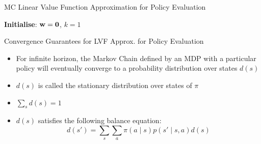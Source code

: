 \documentclass[aspectratio=169]{../latex_main/tntbeamer}  %
\begin{document}
\begin{frame}[c]{MC Linear Value Function Approximation for Policy
		Evaluation}

    \begin{algorithm}[H]
        \caption{Monte Carlo Value Function Approximation}
        \DontPrintSemicolon
        \LinesNotNumbered
        \textbf{Initialise}:  $\mathbf{w}= \mathbf{0}$, $k=1$\\
    \end{algorithm}
	
\end{frame}
\begin{frame}[c]{Convergence Guarantees for LVF Approx. for Policy Evaluation}
	
	\begin{itemize}
		\item For infinite horizon, the Markov Chain defined by an MDP with a particular policy will eventually converge to a probability distribution over states $d(s)$
		\item $d(s)$ is called the stationary distribution over states of $\pi$
		\item $\sum_{s} d(s) = 1$
		\item $d(s)$ satisfies the following balance equation:
		$$ d(s') = \sum_{s} \sum_{a} \pi(a \mid s) p(s' \mid s,a) d(s) $$
	\end{itemize}
	
\end{frame}
\end{document}
